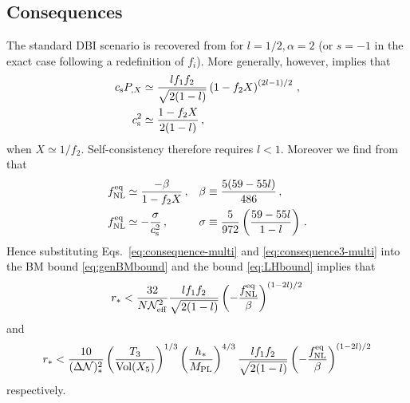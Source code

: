 



\subsection{Consequences}
\label{sec:consequences-multi}

The standard DBI scenario is recovered from  for
$l=1/2, \alpha = 2$ (or $s=-1$ in the exact case following a redefinition of
$f_i$). 
More generally, however,  implies that  
% 
\begin{align}
\label{eq:consequence-multi}
c_\mathrm{s} P_{,X} &\simeq \frac{l f_1 f_2}{\sqrt{2(1-l)}} \left( 
1- f_2X \right)^{(2l-1)/2} \,,
\\
c_\mathrm{s}^2 &\simeq \frac{1-f_2X}{2(1-l)} \,,
\end{align}
% 
when $X \simeq 1/f_2$. Self-consistency therefore
requires $l<1$. Moreover
we find from  that
%  
\begin{align}
\label{eq:consequence3-multi}
f_{\mathrm{NL}}^{\mathrm{eq}} &\simeq \frac{-\beta}{1-f_2X}\,, & \beta &\equiv \frac{5(59-55l)}{486}
\,,
\\
\label{eq:consequence4-multi}
f_{\mathrm{NL}}^{\mathrm{eq}} &\simeq -\frac{\sigma}{c_\mathrm{s}^2}\,, & \sigma &\equiv 
\frac{5}{972} \left( \frac{59-55l}{1-l} \right) \,.
\end{align}
% 
Hence substituting Eqs.~\eqref{eq:consequence-multi} and
\eqref{eq:consequence3-multi} 
into the BM bound \eqref{eq:genBMbound} and the bound \eqref{eq:LHbound}
implies that
%  
\begin{equation}
\label{eq:weakBM-multi}
r_*< \frac{32}{N \mathcal{N}_\mathrm{eff}^2} \frac{l f_1 f_2}{\sqrt{2(1-l)}}
\left( -\frac{f_{\mathrm{NL}}^{\mathrm{eq}}}{\beta} \right)^{(1-2l)/2}
\end{equation}
% 
and
%  
\begin{equation}
\label{eq:weakLH-multi}
r_* < \frac{10}{(\Delta \mathcal{N})_*^2} \left( \frac{T_3}{\mathrm{Vol} (X_5)} \right)^{1/3} 
\left( \frac{h_*}{M_{\mathrm{PL}}} \right)^{4/3}
\frac{l f_1 f_2}{\sqrt{2(1-l)}}
\left( -\frac{f_{\mathrm{NL}}^{\mathrm{eq}}}{\beta} \right)^{(1-2l)/2}
\end{equation}
% 
respectively. 


